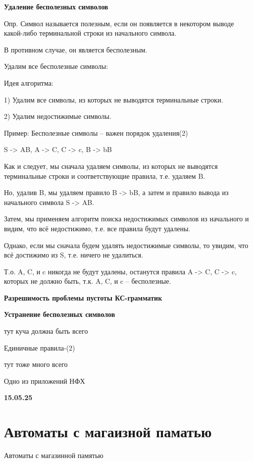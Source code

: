 \documentclass{article}
\begin{document}
\textbf{Удаление бесполезных символов}

 Опр. Символ называется полезным, если он появляется в
некотором выводе какой-либо терминальной строки из
начального символа.

 В противном случае, он является бесполезным.

 Удалим все бесполезные символы:

 Идея алгоритма:

1) Удалим все символы, из которых не выводятся терминальные
строки.

2) Удалим недостижимые символы.


Пример: Бесполезные символы – важен порядок удаления(2)

S -> AB, A -> C, C -> c, B -> bB

 Как и следует, мы сначала удаляем символы, из которых не
выводятся терминальные строки и соответствующие правила, т.е.
удаляем B.

 Но, удалив B, мы удаляем правило B -> bB, а затем и правило
вывода из начального символа S -> AB.

 Затем, мы применяем алгоритм поиска недостижимых символов
из начального и видим, что всё недостижимо, т.е. все правила
будут удалены.

 Однако, если мы сначала будем удалять недостижимые символы,
то увидим, что всё достижимо из S, т.е. ничего не удалиться.

 Т.о. A, C, и c никогда не будут удалены, останутся правила A -> C,
C -> c, которых не должно быть, т.к. A, C, и c – бесполезные.


\textbf{Разрешимость проблемы пустоты
КС-грамматик}




\textbf{Устранение бесполезных символов}




тут куча должна быть всего


Единичные правила-(2)



тут тоже много всего

Одно из приложений НФХ


\vspace{5mm}

\textbf{15.05.25}

\section{Автоматы с магаизной паматью}


Автоматы с магазинной памятью
\end{document}
